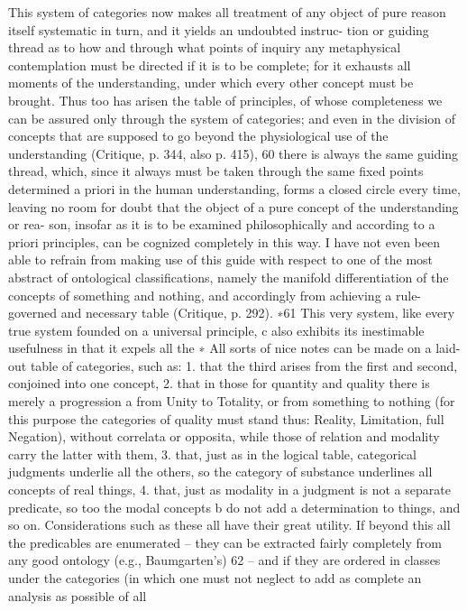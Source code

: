 This system of categories now makes all treatment of any object of
pure reason itself systematic in turn, and it yields an undoubted instruc-
tion or guiding thread as to how and through what points of inquiry any
metaphysical contemplation must be directed if it is to be complete; for
it exhausts all moments of the understanding, under which every other
concept must be brought. Thus too has arisen the table of principles,
of whose completeness we can be assured only through the system of
categories; and even in the division of concepts that are supposed to go
beyond the physiological use of the understanding (Critique, p. 344, also
p. 415), 60 there is always the same guiding thread, which, since it always
must be taken through the same ﬁxed points determined a priori in the
human understanding, forms a closed circle every time, leaving no room
for doubt that the object of a pure concept of the understanding or rea-
son, insofar as it is to be examined philosophically and according to a
priori principles, can be cognized completely in this way. I have not even
been able to refrain from making use of this guide with respect to one
of the most abstract of ontological classiﬁcations, namely the manifold
differentiation of the concepts of something and nothing, and accordingly
from achieving a rule-governed and necessary table (Critique, p. 292). ∗61
This very system, like every true system founded on a universal
principle, c also exhibits its inestimable usefulness in that it expels all the
∗ All sorts of nice notes can be made on a laid-out table of categories, such as:
1. that the third arises from the ﬁrst and second, conjoined into one concept,
2. that in those for quantity and quality there is merely a progression a from
Unity to Totality, or from something to nothing (for this purpose the categories
of quality must stand thus: Reality, Limitation, full Negation), without correlata
or opposita, while those of relation and modality carry the latter with them,
3. that, just as in the logical table, categorical judgments underlie all the others,
so the category of substance underlines all concepts of real things, 4. that,
just as modality in a judgment is not a separate predicate, so too the modal
concepts b do not add a determination to things, and so on. Considerations
such as these all have their great utility. If beyond this all the predicables are
enumerated – they can be extracted fairly completely from any good ontology
(e.g., Baumgarten’s) 62 – and if they are ordered in classes under the categories
(in which one must not neglect to add as complete an analysis as possible of all
